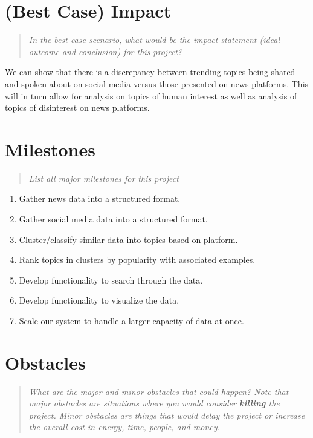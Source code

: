 \documentclass{proc}
\begin{document}
\section{(Best Case) Impact}
\begin{quote}
\emph{In the best-case scenario, what would be the impact statement (ideal outcome and conclusion) for this project?} 
\end{quote}

We can show that there is a discrepancy between trending topics being shared and spoken about on social media versus those presented on news platforms. This will in turn allow for analysis on topics of human interest as well as analysis of topics of disinterest on news platforms.

\section{Milestones}
\begin{quote}
\emph{List all major milestones for this project}
\end{quote}

\begin{enumerate}
  \item Gather news data into a structured format.
  \item Gather social media data into a structured format.
  \item Cluster/classify similar data into topics based on platform.
  \item Rank topics in clusters by popularity with associated examples.
  \item Develop functionality to search through the data.
  \item Develop functionality to visualize the data.
  \item Scale our system to handle a larger capacity of data at once.
\end{enumerate}

\section{Obstacles}
\begin{quote}
\emph{What are the major and minor obstacles that could happen? 
Note that major obstacles are situations where you would consider \textbf{killing} the project. 
Minor obstacles are things that would delay the project or increase the overall cost in energy, time, people, and money.}
\end{quote}
\end{document}
